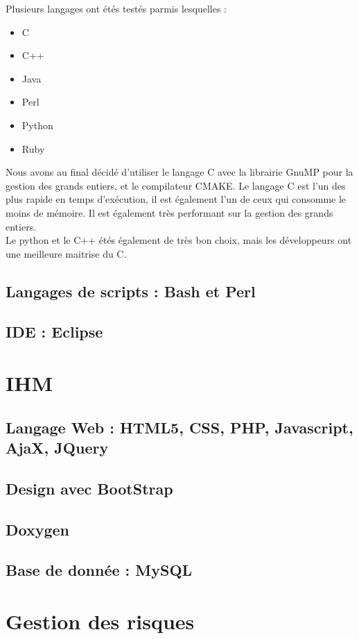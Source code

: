 Plusieurs langages ont étés testés parmis lesquelles :
\begin{itemize}
\item C
\item C++
\item Java
\item Perl
\item Python
\item Ruby
\end{itemize}

Nous avons au final décidé d'utiliser le langage C avec la librairie GnuMP \cite{gmplib} pour la gestion des grands entiers, et le compilateur CMAKE.
Le langage C est l'un des plus rapide en temps d'exécution, il est également l'un de ceux qui consomme le moins de mémoire. Il est également très performant sur la gestion des grands entiers.\\
Le python et le C++ étés également de très bon choix, mais les développeurs ont une meilleure maitrise du C.

\subsection{Langages de scripts : Bash et Perl}

\subsection{IDE : Eclipse}

\section{IHM}

\subsection{Langage Web : HTML5, CSS, PHP, Javascript, AjaX, JQuery}

\subsection{Design avec BootStrap}

\subsection{Doxygen}

\subsection{Base de donnée : MySQL}

\section{Gestion des risques}
